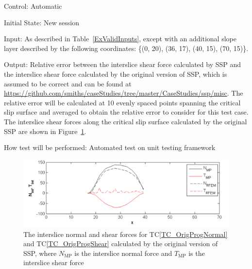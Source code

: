 \documentclass[12pt, titlepage]{article}
\newcommand{\tcref}[1]{TC\ref{#1}}
\newcommand{\progname}{SSP}
\begin{document}
\begin{enumerate}[label=TC\arabic*:,ref={\arabic*}]
Control: Automatic

Initial State: New session

Input: As described in Table~\ref{ExValidInputs}, except with an additional 
slope layer described by the following coordinates: \{(0, 20), (36, 17), (40, 
15), (70, 15)\}.

Output: Relative error between the interslice shear force calculated by 
\progname{} and the interslice shear force calculated by the original version 
of \progname{}, which is assumed to be correct and can be found at 
\newline
\href{https://github.com/smiths/caseStudies/tree/master/CaseStudies/ssp/misc}
{https://github.com/smiths/caseStudies/tree/master/CaseStudies/ssp/misc}. The 
relative error will be calculated at 10 evenly spaced points spanning the 
critical slip surface and averaged to obtain the relative error to consider for 
this test case. The interslice shear forces along the critical slip surface 
calculated by the original \progname{} are shown in Figure~\ref{OrigProgForces}.

How test will be performed: Automated test on unit testing framework

\begin{figure}[h!]
	\begin{center}
		\includegraphics[width=1.0\textwidth]{OrigProgForces.png}
		\caption{The interslice normal and shear forces for 
			\tcref{TC_OrigProgNormal} and \tcref{TC_OrigProgShear} calculated 
			by the original version of \progname{}, where $N_\text{MP}$ is the 
			interslice normal force and $T_\text{MP}$ is the interslice shear 
			force}
		\label{OrigProgForces}
	\end{center}
\end{figure}

\end{enumerate}

\end{document}
